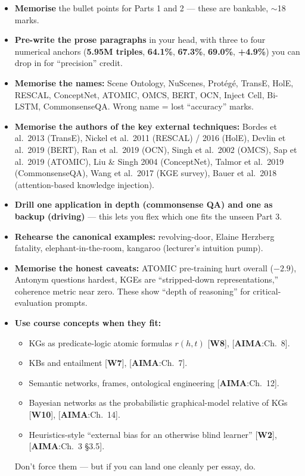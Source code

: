 \documentclass[11pt, a4paper]{article}
\newcommand{\aimaref}[1]{\textcolor{srcBd}{\small[\textbf{AIMA}:#1]}}
\newcommand{\courseref}[1]{\textcolor{srcBd}{\small[\textbf{W#1}]}}
\begin{document}
\begin{itemize}
  \item \textbf{Memorise} the bullet points for Parts 1 and 2 — these are bankable, $\sim$18 marks.
  \item \textbf{Pre-write the prose paragraphs} in your head, with three to four numerical anchors (\textbf{5.95M triples}, \textbf{64.1\%}, \textbf{67.3\%}, \textbf{69.0\%}, \textbf{+4.9\%}) you can drop in for ``precision'' credit.
  \item \textbf{Memorise the names:} Scene Ontology, NuScenes, Protégé, TransE, HolE, RESCAL, ConceptNet, ATOMIC, OMCS, BERT, OCN, Inject Cell, Bi-LSTM, CommonsenseQA. Wrong name = lost ``accuracy'' marks.
  \item \textbf{Memorise the authors of the key external techniques:} Bordes et al.\ 2013 (TransE), Nickel et al.\ 2011 (RESCAL) / 2016 (HolE), Devlin et al.\ 2019 (BERT), Ran et al.\ 2019 (OCN), Singh et al.\ 2002 (OMCS), Sap et al.\ 2019 (ATOMIC), Liu \& Singh 2004 (ConceptNet), Talmor et al.\ 2019 (CommonsenseQA), Wang et al.\ 2017 (KGE survey), Bauer et al.\ 2018 (attention-based knowledge injection).
  \item \textbf{Drill one application in depth (commonsense QA) and one as backup (driving)} — this lets you flex which one fits the unseen Part 3.
  \item \textbf{Rehearse the canonical examples:} revolving-door, Elaine Herzberg fatality, elephant-in-the-room, kangaroo (lecturer's intuition pump).
  \item \textbf{Memorise the honest caveats:} ATOMIC pre-training hurt overall ($-2.9$), Antonym questions hardest, KGEs are ``stripped-down representations,'' coherence metric near zero. These show ``depth of reasoning'' for critical-evaluation prompts.
  \item \textbf{Use course concepts when they fit:}
    \begin{itemize}
      \item KGs as predicate-logic atomic formulas \(r(h,t)\) \courseref{8}, \aimaref{Ch.\ 8}.
      \item KBs and entailment \courseref{7}, \aimaref{Ch.\ 7}.
      \item Semantic networks, frames, ontological engineering \aimaref{Ch.\ 12}.
      \item Bayesian networks as the probabilistic graphical-model relative of KGs \courseref{10}, \aimaref{Ch.\ 14}.
      \item Heuristics-style ``external bias for an otherwise blind learner'' \courseref{2}, \aimaref{Ch.\ 3 §3.5}.
    \end{itemize}
    Don't force them — but if you can land one cleanly per essay, do.
\end{itemize}
\end{document}
